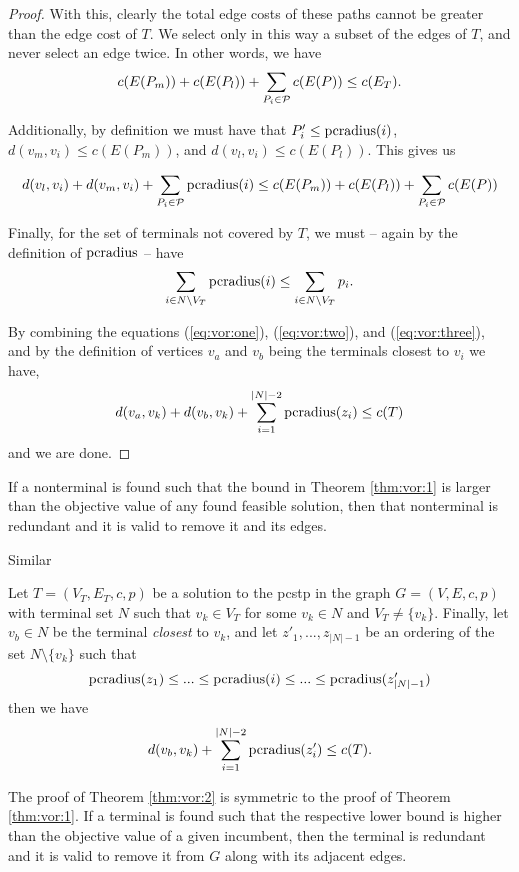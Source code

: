 \begin{proof}
With this, clearly the total edge costs of these paths cannot be greater than the edge cost of $T$. We select only
 in this way a subset of the edges of $T$, and never select an edge twice. In other words, we have
  \begin{equation}
    c(E(P_m)) + c(E(P_l)) + \sum_{P_i \in \mathcal{P}} c(E(P)) \leq c(E_T)\mathnormal{.}\label{eq:vor:one}
  \end{equation}

  
  Additionally, by definition
  we must have that $P_i' \leq \operatorname{pcradius}(i)$, $d(v_m, v_i) \leq c(E(P_m))$, and
  $d(v_l, v_i) \leq c(E(P_l))$. This gives us

  \begin{equation}
d(v_l, v_i) + d(v_m, v_i) + \sum_{P_i \in \mathcal{P}} \operatorname{pcradius}(i) \leq c(E(P_m)) + c(E(P_l)) + \sum_{P_i \in \mathcal{P}} c(E(P))\label{eq:vor:two}
\end{equation}


  Finally, for the set of terminals not covered by $T$, we must -- again by the definition of $\operatorname{pcradius}$ -- have
  \begin{equation}
  \sum_{i \in N \setminus V_T} \operatorname{pcradius}(i) \leq \sum_{i \in N \setminus V_T} p_i \mathnormal{.}\label{eq:vor:three}
  \end{equation}

  By combining the equations (\ref{eq:vor:one}), (\ref{eq:vor:two}), and (\ref{eq:vor:three}), and
   by the definition of vertices $v_a$ and $v_b$ being the terminals closest to $v_i$ we have,
   $$d(v_a, v_k) + d(v_b, v_k) + \sum_{i = 1}^{|N| - 2} \operatorname{pcradius}(z_i) \leq c(T)$$
   and we are done.
 \end{proof}
 If a nonterminal is found such that the bound in Theorem \ref{thm:vor:1} is larger than the objective value of
 any found feasible solution, then that nonterminal is redundant and it is valid to remove it and its edges.

 Similar 
\begin{theorem}\label{thm:vor:2}
  Let $T = (V_T, E_T, c, p)$ be a solution to the \gls{pcstp} in the graph $G = (V, E, c, p)$ with terminal set $N$ such that
  $v_k \in V_T$ for some $v_k \in N$ and $V_T \neq \{v_k\}$. Finally, let $v_b \in N$ be the terminal \textit{closest}
  to $v_k$, and let $z'_1, ..., z_{|N|-1}$ be an ordering of the set $N \setminus \{v_k\}$ such that
  $$\operatorname{pcradius}(z_1) \leq ... \leq \operatorname{pcradius}(i) \leq ... \leq \operatorname{pcradius}(z'_{|N|-1})$$
  then we have
  $$d(v_b, v_k) + \sum_{i = 1}^{|N| - 2} \operatorname{pcradius}(z'_i) \leq c(T)\mathnormal{.}$$
\end{theorem}
The proof of Theorem \ref{thm:vor:2} is symmetric to the proof of Theorem \ref{thm:vor:1}. If a terminal is found such that
the respective lower bound is higher than the objective value of a given incumbent, then the terminal is redundant and it is
 valid to remove it from $G$ along with its adjacent edges.

